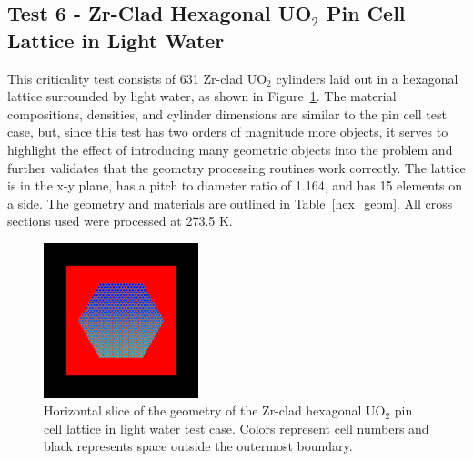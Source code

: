 \documentclass[preprint,12pt]{elsarticle}
\begin{document}
\newpage
\subsection{Test 6 - Zr-Clad Hexagonal UO$_2$ Pin Cell Lattice in Light Water}

This criticality test consists of 631 Zr-clad UO$_2$ cylinders laid out in a hexagonal lattice surrounded by light water, as shown in Figure~\ref{hex_geom_pic}.  The material compositions, densities, and cylinder dimensions are similar to the pin cell test case, but, since this test has two orders of magnitude more objects, it serves to highlight the effect of introducing many geometric objects into the problem and further validates that the geometry processing routines work correctly.  The lattice is in the x-y plane, has a pitch to diameter ratio of 1.164, and has 15 elements on a side.  The geometry and materials are outlined in Table~\ref{hex_geom}.  All cross sections used were processed at 273.5 K.

\begin{figure}[h!] 
  \centering
    \includegraphics[width=0.4\textwidth]{graphics/assembly-lw-xy.png}
     \caption{ Horizontal slice of the geometry of the Zr-clad hexagonal UO$_2$ pin cell lattice in light water test case.  Colors represent cell numbers and black represents space outside the outermost boundary. \label{hex_geom_pic} }
\end{figure}
\end{document}
